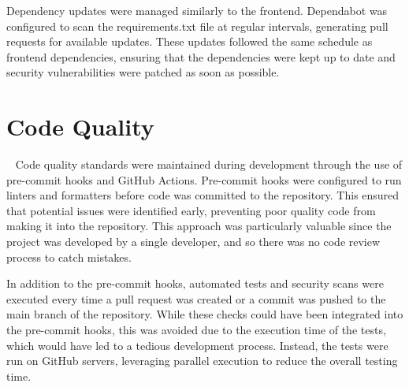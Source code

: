Dependency updates were managed similarly to the frontend. Dependabot was configured to scan the requirements.txt file at regular intervals, generating pull requests for available updates. These updates followed the same schedule as frontend dependencies, ensuring that the dependencies were kept up to date and security vulnerabilities were patched as soon as possible.

\section{Code Quality}~\label{sec:code-quality}
Code quality standards were maintained during development through the use of pre-commit hooks and GitHub Actions. Pre-commit hooks were configured to run linters and formatters before code was committed to the repository. This ensured that potential issues were identified early, preventing poor quality code from making it into the repository. This approach was particularly valuable since the project was developed by a single developer, and so there was no code review process to catch mistakes.

In addition to the pre-commit hooks, automated tests and security scans were executed every time a pull request was created or a commit was pushed to the main branch of the repository. While these checks could have been integrated into the pre-commit hooks, this was avoided due to the execution time of the tests, which would have led to a tedious development process. Instead, the tests were run on GitHub servers, leveraging parallel execution to reduce the overall testing time.
